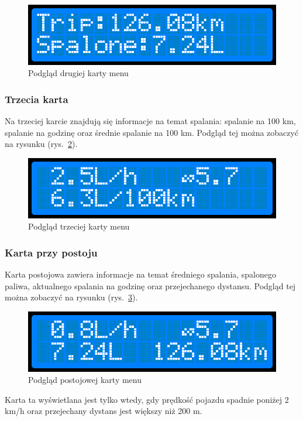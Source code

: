\begin{figure}[!htb]
\centering
\includegraphics[width=0.7\linewidth]{Rysunki/menu2.png}
\caption{Podgląd drugiej karty menu}
\label{fig:menu2}
\end{figure}

\subsubsection{Trzecia karta}
Na trzeciej karcie znajdują się informacje na temat spalania: spalanie na 100 km, spalanie na godzinę oraz średnie spalanie na 100 km. Podgląd tej można zobaczyć na rysunku (rys.~\ref{fig:menu3}).

\begin{figure}[!htb]
\centering
\includegraphics[width=0.7\linewidth]{Rysunki/menu3.png}
\caption{Podgląd trzeciej karty menu}
\label{fig:menu3}
\end{figure}


\subsubsection{Karta przy postoju}
Karta postojowa zawiera informacje na temat średniego spalania, spalonego paliwa, aktualnego spalania na godzinę oraz przejechanego dystansu. Podgląd tej można zobaczyć na rysunku (rys.~\ref{fig:menu0}).

\begin{figure}[!htb]
\centering
\includegraphics[width=0.7\linewidth]{Rysunki/menu0.png}
\caption{Podgląd postojowej karty menu}
\label{fig:menu0}
\end{figure}

Karta ta wyświetlana jest tylko wtedy, gdy prędkość pojazdu spadnie poniżej 2 km/h oraz przejechany dystans jest większy niż 200 m.

